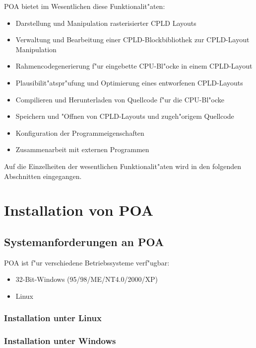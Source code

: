 \documentclass[a4paper,titlepage,12pt,ngerman]{scrbook}
\begin{document}
 POA bietet im Wesentlichen diese Funktionalit"aten:
\begin{itemize}
\item Darstellung und Manipulation rasterisierter CPLD Layouts
\item Verwaltung und Bearbeitung einer CPLD-Blockbibliothek zur CPLD-Layout
      Manipulation
\item Rahmencodegenerierung f"ur eingebette CPU-Bl"ocke in einem CPLD-Layout
\item Plausibilit"atspr"ufung und Optimierung eines entworfenen CPLD-Layouts
\item Compilieren und Herunterladen von Quellcode f"ur die CPU-Bl"ocke
\item Speichern und "Offnen von CPLD-Layouts und zugeh"origem Quellcode
\item Konfiguration der Programmeigenschaften
\item Zusammenarbeit mit externen Programmen
\end{itemize}
Auf die Einzelheiten der wesentlichen Funktionalit"aten wird in den folgenden
Abschnitten eingegangen.



\chapter{Installation von POA}

\section{Systemanforderungen an POA}
POA ist f"ur verschiedene Betriebssysteme verf"ugbar:
\begin{itemize}
\item 32-Bit-Windows (95/98/ME/NT4.0/2000/XP)
\item Linux
\end{itemize}


\subsection{Installation unter Linux}
	
\subsection{Installation unter Windows}


	
\end{document}
